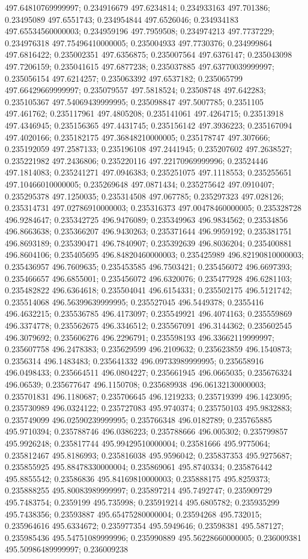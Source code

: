 497.64810769999997; 0.234916679 497.6234814; 0.234933163 497.701386; 0.23495089 497.6551743; 0.234954844 497.6526046; 0.234934183 497.65534560000003; 0.234959196 497.7959508; 0.234974213 497.7737229; 0.234976318 497.75496410000005; 0.235004933 497.7730376; 0.234999864 497.6816422; 0.235002351 497.6356875; 0.235007564 497.6376147; 0.235043098 497.7206159; 0.235041615 497.6877238; 0.235037885 497.63770039999997; 0.235056154 497.6214257; 0.235063392 497.6537182; 0.235065799 497.66429669999997; 0.235079557 497.5818524; 0.23508748 497.642283; 0.235105367 497.54069439999995; 0.235098847 497.5007785; 0.2351105 497.461762; 0.235117961 497.4805208; 0.235141061 497.4264715; 0.23513918 497.4346945; 0.235156365 497.4431745; 0.235156142 497.3936223; 0.235167094 497.4020166; 0.235182175 497.36848210000005; 0.235178747 497.307666; 0.235192059 497.2587133; 0.235196108 497.2441945; 0.235207602 497.2638527; 0.235221982 497.2436806; 0.235220116 497.22170969999996; 0.23524446 497.1814083; 0.235241271 497.0946383; 0.235251075 497.1118553; 0.235255651 497.10466010000005; 0.235269648 497.0871434; 0.235275642 497.0910407; 0.235295378 497.1250035; 0.235314508 497.067785; 0.235297323 497.028126; 0.235314731 497.02786910000003; 0.235316373 497.00478460000005; 0.235328728 496.9284647; 0.235342725 496.9476089; 0.235349963 496.9834562; 0.23534856 496.8663638; 0.235366207 496.9430263; 0.235371644 496.9959192; 0.235381751 496.8693189; 0.235390471 496.7840907; 0.235392639 496.8036204; 0.235400881 496.8604106; 0.235405695 496.84820460000003; 0.235425989 496.82190810000003; 0.235436957 496.7609635; 0.235453585 496.7503421; 0.235456072 496.6697393; 0.235466657 496.6855001; 0.235456072 496.6320076; 0.235477928 496.6281103; 0.235482822 496.6364618; 0.235504041 496.6154331; 0.235502175 496.5121742; 0.235514068 496.56399639999995; 0.235527045 496.5449378; 0.2355416 496.4632215; 0.235536785 496.4173097; 0.235549921 496.4074163; 0.235559869 496.3374778; 0.235562675 496.3346512; 0.235567091 496.3144362; 0.235602545 496.3079692; 0.235606276 496.2296791; 0.235598193 496.33662119999997; 0.235607758 496.2478383; 0.235629599 496.2109632; 0.235623859 496.1540873; 0.2356314 496.1483483; 0.235641332 496.09733989999995; 0.235658916 496.0498433; 0.235664511 496.0804227; 0.235661945 496.0665035; 0.235676324 496.06539; 0.235677647 496.1150708; 0.235689938 496.06132130000003; 0.235701831 496.1180687; 0.235706645 496.1219233; 0.235719399 496.1423095; 0.235730989 496.0324122; 0.235727083 495.9740374; 0.235750103 495.9832883; 0.235749099 496.02590239999995; 0.235766348 496.0182789; 0.235765885 495.9710394; 0.235788746 496.0386223; 0.235788666 496.005302; 0.235799857 495.9926248; 0.235817744 495.99429510000004; 0.23581666 495.9775064; 0.235812467 495.8186993; 0.235816038 495.9596042; 0.235837353 495.9275687; 0.235855925 495.88478330000004; 0.235869061 495.8740334; 0.235876442 495.8855542; 0.23586836 495.84169810000003; 0.235888175 495.8259373; 0.235888255 495.80083989999997; 0.235897214 495.7492747; 0.235909729 495.7483754; 0.2359199 495.735998; 0.235919214 495.6805782; 0.235935299 495.7438356; 0.23593887 495.65475280000004; 0.23594268 495.732015; 0.235964616 495.6334672; 0.235977354 495.5949646; 0.23598381 495.587127; 0.235985436 495.54751089999996; 0.235990889 495.56228660000005; 0.236009381 495.50986489999997; 0.236009238 